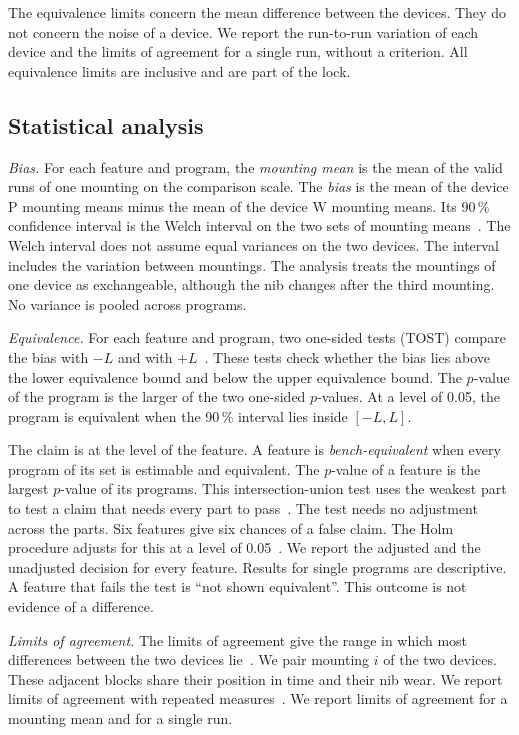 The equivalence limits concern the mean difference between the devices.
They do not concern the noise of a device.
We report the run-to-run variation of each device and the limits of agreement for a single run, without a criterion.
All equivalence limits are inclusive and are part of the lock.

\subsection{Statistical analysis}
\label{sec:stats}
\emph{Bias.}
For each feature and program, the \emph{mounting mean} is the mean of the valid runs of one mounting on the comparison scale.
The \emph{bias} is the mean of the device P mounting means minus the mean of the device W mounting means.
Its 90\,\% confidence interval is the Welch interval on the two sets of mounting means~\cite{Welch1947}.
The Welch interval does not assume equal variances on the two devices.
The interval includes the variation between mountings.
The analysis treats the mountings of one device as exchangeable, although the nib changes after the third mounting.
No variance is pooled across programs.

\emph{Equivalence.}
For each feature and program, two one-sided tests (TOST) compare the bias with $-L$ and with $+L$~\cite{Schuirmann1987,Lakens2017}.
These tests check whether the bias lies above the lower equivalence bound and below the upper equivalence bound.
The $p$-value of the program is the larger of the two one-sided $p$-values.
At a level of 0.05, the program is equivalent when the 90\,\% interval lies inside $[-L,L]$.

The claim is at the level of the feature.
A feature is \emph{bench-equivalent} when every program of its set is estimable and equivalent.
The $p$-value of a feature is the largest $p$-value of its programs.
This intersection-union test uses the weakest part to test a claim that needs every part to pass~\cite{Berger1996}.
The test needs no adjustment across the parts.
Six features give six chances of a false claim.
The Holm procedure adjusts for this at a level of 0.05~\cite{Holm1979}.
We report the adjusted and the unadjusted decision for every feature.
Results for single programs are descriptive.
A feature that fails the test is ``not shown equivalent''.
This outcome is not evidence of a difference.

\emph{Limits of agreement.}
The limits of agreement give the range in which most differences between the two devices lie~\cite{Bland1986}.
We pair mounting $i$ of the two devices.
These adjacent blocks share their position in time and their nib wear.
We report limits of agreement with repeated measures~\cite{Bland1999}.
We report limits of agreement for a mounting mean and for a single run.

